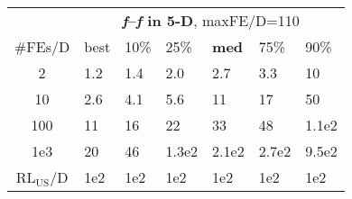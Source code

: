 \begin{tabular}{c|llllll}
 & \multicolumn{6}{|c}{\textbf{\textit{f}\raisebox{-0.35ex}{1}--\textit{f}\raisebox{-0.35ex}{24} in 5-D}, maxFE/D=110}\\
\#FEs/D & best & 10\% & 25\% & \textbf{med} & 75\% & 90\%\\
2 & \hspace*{1ex}1.2 & \hspace*{1ex}1.4 & \hspace*{1ex}2.0 & \hspace*{1ex}2.7 & \hspace*{1ex}3.3 & 10\\
10 & \hspace*{1ex}2.6 & \hspace*{1ex}4.1 & \hspace*{1ex}5.6 & 11 & 17 & 50\\
100 & 11 & 16 & 22 & 33 & 48 & 1.1e2\\
1e3 & 20 & 46 & 1.3e2 & 2.1e2 & 2.7e2 & 9.5e2\\
$\text{RL}_{\text{US}}$/D & 1e2 & 1e2 & 1e2 & 1e2 & 1e2 & 1e2
\end{tabular}
